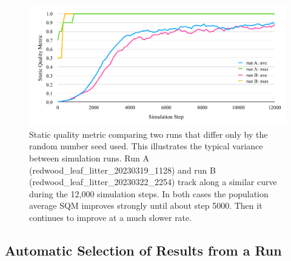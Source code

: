 \documentclass[letterpaper]{article}
\newcommand{\runID}{\footnotesize}
\begin{document}
\begin{figure}[t]
    \includegraphics[width=\columnwidth]{SQM_plot_run_variance.pdf}
    \caption{Static quality metric comparing two runs that differ only by the random number seed used. This illustrates the typical variance between simulation runs. Run A ({\runID redwood\_leaf\_litter\_20230319\_1128}) and run B ({\runID redwood\_leaf\_litter\_20230322\_2254}) track along a similar curve during the 12,000 simulation steps. In both cases the population average SQM improves strongly until about step 5000. Then it continues to improve at a much slower rate.}
    \label{fig:sqm_variance}
\end{figure}

\subsection{Automatic Selection of Results from a Run}
\label{subsec:auto_curation}
\end{document}
